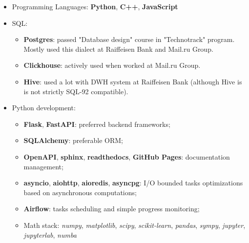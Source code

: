 \begin{itemize}
	\item Programming Languages:
    \textbf{Python}, \textbf{C++}, \textbf{JavaScript}
    \item SQL: 
        \begin{itemize}
            \item \textbf{Postgres}: passed "Database design" course in "Technotrack" program. Mostly used this dialect at Raiffeisen Bank and Mail.ru Group.
            \item \textbf{Clickhouse}: actively used when worked at Mail.ru Group.
            \item \textbf{Hive}: used a lot with DWH system at Raiffeisen Bank (although Hive is is not strictly SQL-92 compatible).
        \end{itemize}
    \item Python development: 
        \begin{itemize}
            \item \textbf{Flask}, \textbf{FastAPI}: preferred backend frameworks;
            \item \textbf{SQLAlchemy}: preferable ORM;
            \item \textbf{OpenAPI}, \textbf{sphinx}, \textbf{readthedocs}, \textbf{GitHub Pages}: documentation management;
            \item \textbf{asyncio}, \textbf{aiohttp}, \textbf{aioredis}, \textbf{asyncpg}: I/O bounded tasks optimizations based on asynchronous computations;
            \item \textbf{Airflow}: tasks scheduling and simple progress monitoring;
            \item Math stack: \textit{numpy}, \textit{matplotlib}, \textit{scipy}, \textit{scikit-learn}, \textit{pandas}, \textit{sympy}, \textit{jupyter}, \textit{jupyterlab}, \textit{numba}

\end{itemize}
\end{itemize}
